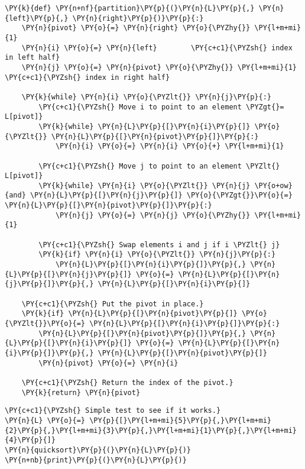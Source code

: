 \begin{Verbatim}[commandchars=\\\{\}]
\PY{k}{def} \PY{n+nf}{partition}\PY{p}{(}\PY{n}{L}\PY{p}{,} \PY{n}{left}\PY{p}{,} \PY{n}{right}\PY{p}{)}\PY{p}{:}
    \PY{n}{pivot} \PY{o}{=} \PY{n}{right} \PY{o}{\PYZhy{}} \PY{l+m+mi}{1}
    \PY{n}{i} \PY{o}{=} \PY{n}{left}        \PY{c+c1}{\PYZsh{} index in left half}
    \PY{n}{j} \PY{o}{=} \PY{n}{pivot} \PY{o}{\PYZhy{}} \PY{l+m+mi}{1}   \PY{c+c1}{\PYZsh{} index in right half}

    \PY{k}{while} \PY{n}{i} \PY{o}{\PYZlt{}} \PY{n}{j}\PY{p}{:}
        \PY{c+c1}{\PYZsh{} Move i to point to an element \PYZgt{}= L[pivot]}
        \PY{k}{while} \PY{n}{L}\PY{p}{[}\PY{n}{i}\PY{p}{]} \PY{o}{\PYZlt{}} \PY{n}{L}\PY{p}{[}\PY{n}{pivot}\PY{p}{]}\PY{p}{:}
            \PY{n}{i} \PY{o}{=} \PY{n}{i} \PY{o}{+} \PY{l+m+mi}{1}

        \PY{c+c1}{\PYZsh{} Move j to point to an element \PYZlt{} L[pivot]}
        \PY{k}{while} \PY{n}{i} \PY{o}{\PYZlt{}} \PY{n}{j} \PY{o+ow}{and} \PY{n}{L}\PY{p}{[}\PY{n}{j}\PY{p}{]} \PY{o}{\PYZgt{}}\PY{o}{=} \PY{n}{L}\PY{p}{[}\PY{n}{pivot}\PY{p}{]}\PY{p}{:}
            \PY{n}{j} \PY{o}{=} \PY{n}{j} \PY{o}{\PYZhy{}} \PY{l+m+mi}{1}

        \PY{c+c1}{\PYZsh{} Swap elements i and j if i \PYZlt{} j}
        \PY{k}{if} \PY{n}{i} \PY{o}{\PYZlt{}} \PY{n}{j}\PY{p}{:}
            \PY{n}{L}\PY{p}{[}\PY{n}{i}\PY{p}{]}\PY{p}{,} \PY{n}{L}\PY{p}{[}\PY{n}{j}\PY{p}{]} \PY{o}{=} \PY{n}{L}\PY{p}{[}\PY{n}{j}\PY{p}{]}\PY{p}{,} \PY{n}{L}\PY{p}{[}\PY{n}{i}\PY{p}{]}

    \PY{c+c1}{\PYZsh{} Put the pivot in place.}
    \PY{k}{if} \PY{n}{L}\PY{p}{[}\PY{n}{pivot}\PY{p}{]} \PY{o}{\PYZlt{}}\PY{o}{=} \PY{n}{L}\PY{p}{[}\PY{n}{i}\PY{p}{]}\PY{p}{:}
        \PY{n}{L}\PY{p}{[}\PY{n}{pivot}\PY{p}{]}\PY{p}{,} \PY{n}{L}\PY{p}{[}\PY{n}{i}\PY{p}{]} \PY{o}{=} \PY{n}{L}\PY{p}{[}\PY{n}{i}\PY{p}{]}\PY{p}{,} \PY{n}{L}\PY{p}{[}\PY{n}{pivot}\PY{p}{]}
        \PY{n}{pivot} \PY{o}{=} \PY{n}{i}

    \PY{c+c1}{\PYZsh{} Return the index of the pivot.}
    \PY{k}{return} \PY{n}{pivot}
\end{Verbatim}



\begin{Verbatim}[commandchars=\\\{\}]
\PY{c+c1}{\PYZsh{} Simple test to see if it works.}
\PY{n}{L} \PY{o}{=} \PY{p}{[}\PY{l+m+mi}{5}\PY{p}{,}\PY{l+m+mi}{2}\PY{p}{,}\PY{l+m+mi}{3}\PY{p}{,}\PY{l+m+mi}{1}\PY{p}{,}\PY{l+m+mi}{4}\PY{p}{]}
\PY{n}{quicksort}\PY{p}{(}\PY{n}{L}\PY{p}{)}
\PY{n+nb}{print}\PY{p}{(}\PY{n}{L}\PY{p}{)}
\end{Verbatim}

